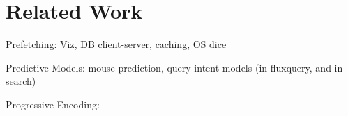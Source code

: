 \section{Related Work}

Prefetching:  Viz, DB client-server, caching, OS
dice~\cite{jayachandran2014combining}

Predictive Models: mouse prediction, query intent models (in fluxquery, and in search)

Progressive Encoding: 
